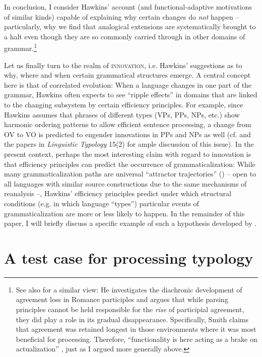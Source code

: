 \documentclass[output=paper]{langsci/langscibook}
\begin{document}
In conclusion, I consider Hawkins’ account (and functional-adaptive motivations of similar kinds) capable of explaining why certain changes do \textit{not} happen – particularly, why we find that analogical extensions are systematically brought to a halt even though they are so commonly carried through in other domains of grammar.\footnote{See also \citet{Smith2001} for a similar view: He investigates the diachronic development of agreement loss in Romance participles and argues that while parsing principles cannot be held responsible for the \textit{rise} of participial agreement, they did play a role in its gradual disappearance. Specifically, Smith claims that agreement was retained longest in those environments where it was most beneficial for processing. Therefore, “functionality is here acting as a brake on actualization” \citep[214]{Smith2001}, just as I argued more generally above.}

Let us finally turn to the realm of \textsc{innovation}, i.e. Hawkins’ suggestions as to why, where and when certain grammatical structures emerge. A central concept here is that of correlated evolution: When a language changes in one part of the grammar, Hawkins often expects to see “ripple effects” \citep[88]{Hawkins2014_VarEff} in domains that are linked to the changing subsystem by certain efficiency principles. For example, since Hawkins assumes that phrases of different types (VPs, PPs, NPs, etc.) show harmonic ordering patterns to allow efficient sentence processing, a change from OV to VO is predicted to engender innovations in PPs and NPs as well (cf. \citealt{DunnEtAl2011} and the papers in \textit{Linguistic Typology} 15(2) for ample discussion of this issue). In the present context, perhaps the most interesting claim with regard to innovation is that efficiency principles can predict the occurrence of grammaticalization: While many grammaticalization paths are universal “attractor trajectories” (\citealt{BybeeBeckner2015}) – open to all languages with similar source constructions due to the same mechanisms of reanalysis –, Hawkins’ efficiency principles predict under which structural conditions (e.g. in which language “types”) particular events of grammaticalization are more or less likely to happen. In the remainder of this paper, I will briefly discuss a specific example of such a hypothesis developed by \citet{Hawkins2014_VarEff}.

\section{ A test case for processing typology} 
\end{document}
